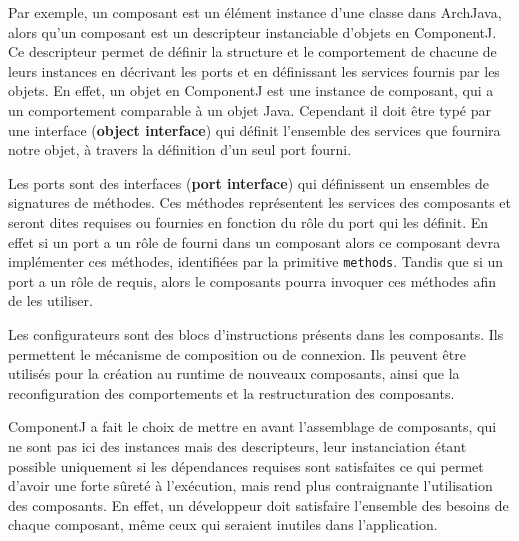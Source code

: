   Par exemple, un composant est un élément instance d'une classe dans ArchJava, alors qu'un composant est un descripteur instanciable d'objets en ComponentJ. Ce descripteur permet de définir la structure et le comportement de chacune de leurs instances en décrivant les ports et en définissant les services fournis par les objets. En effet, un objet en ComponentJ est une instance de composant, qui a un comportement comparable à un objet Java. Cependant il doit être typé par une interface (\textbf{object interface}) qui définit l'ensemble des services que fournira notre objet, à travers la définition d'un seul port fourni.
    
  Les ports sont des interfaces (\textbf{port interface}) qui définissent un ensembles de signatures de méthodes. Ces méthodes représentent les services des composants et seront dites requises ou fournies en fonction du rôle du port qui les définit. En effet si un port a un rôle de fourni dans un composant alors ce composant devra implémenter ces méthodes, identifiées par la primitive \texttt{methods}. Tandis que si un port a un rôle de requis, alors le composants pourra invoquer ces méthodes afin de les utiliser. 
  
  Les configurateurs sont des blocs d'instructions présents dans les composants. Ils permettent le mécanisme de composition ou de connexion. Ils peuvent être utilisés pour la création au runtime de nouveaux composants, ainsi que la reconfiguration des comportements et la restructuration des composants.
  
  ComponentJ a fait le choix de mettre en avant l'assemblage de composants, qui ne sont pas ici des instances mais des descripteurs, leur instanciation étant possible uniquement si les dépendances requises sont satisfaites ce qui permet d'avoir une forte sûreté à l'exécution, mais rend plus contraignante l'utilisation des composants. En effet, un développeur doit satisfaire l'ensemble des besoins de chaque composant, même ceux qui seraient inutiles dans l'application. \\\par
  
  

    
      
